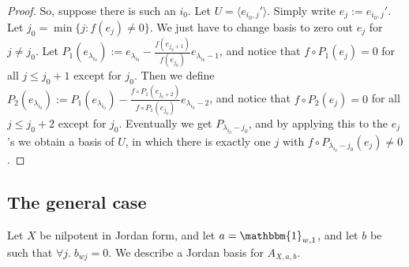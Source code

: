 \documentclass[12pt,psamsfonts]{article}
\begin{document}
\begin{proof}
    So, suppose there is such an \(i_0\).
    Let \(U = \langle e_{i_0, j}' \rangle\).
    Simply write \(e_j := e_{i_0, j}'\).
    Let \(j_0 = \min\{j : f(e_j) \neq 0\}\).
    We just have to change basis to zero out \(e_j\) for \(j \neq j_0\).
    Let \(P_1(e_{\lambda_{i_0}}) := e_{\lambda_{i_0}} - \frac{f(e_{j_0 + 1})}{f(e_{j_0})} e_{\lambda_{i_0} - 1}\), and notice that \(f \circ P_1(e_j) = 0\) for all \(j \leq j_0 + 1\) except for \(j_0\).
    Then we define \(P_2(e_{\lambda_{i_0}}) := P_1(e_{\lambda_{i_0}}) - \frac{f\circ P_1(e_{j_0 + 2})}{f\circ P_1(e_{j_0})} e_{\lambda_{i_0} - 2}\), and notice that \(f \circ P_2(e_j) = 0\) for all \(j \leq j_0 + 2\) except for \(j_0\).    
    Eventually we get \(P_{\lambda_{i_0} - j_0}\), and by applying this to the \(e_j\)'s we obtain a basis of \(U\), in which there is exactly one \(j\) with \(f \circ P_{\lambda_{i_0} - j_0}(e_j) \neq 0\).
\end{proof}

\subsection{The general case}
Let \(X\) be nilpotent in Jordan form, and let \(a = \mathbbm{1}_{w,1}\), and let \(b\) be such that \(\forall j. \; b_{wj} = 0\).
We describe a Jordan basis for \(A_{X, a, b}\).
\end{document}
